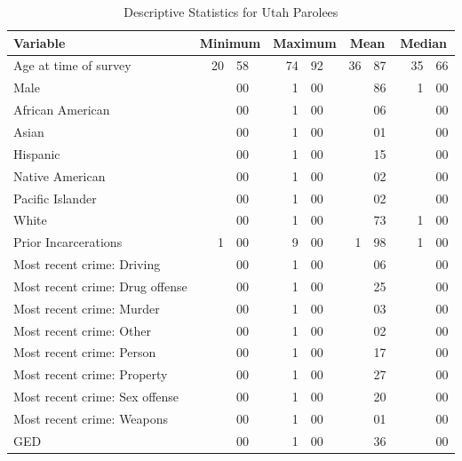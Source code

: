 \begin{table}[h]
\begin{center}
\caption{Descriptive Statistics for Utah Parolees}
\vspace{0.1cm}
\small
\begin{tabular}{lr@{.}lr@{.}lr@{.}lr@{.}l}
  \hline
  Variable & \multicolumn{2}{c}{Minimum} & \multicolumn{2}{c}{Maximum} & \multicolumn{2}{c}{Mean} & \multicolumn{2}{c}{Median} \\ \hline
  Age at time of survey & \hspace{0.25cm} 20 & 58 & \hspace{0.25cm} 74 & 92 & 36 & 87 & \ \ 35 & 66 \\
  Male                 &    & 00 &  1 & 00 &    & 86 &  1 & 00 \\
  African American     &    & 00 &  1 & 00 &    & 06 &    & 00 \\
  Asian                &    & 00 &  1 & 00 &    & 01 &    & 00 \\
  Hispanic             &    & 00 &  1 & 00 &    & 15 &    & 00 \\
  Native American      &    & 00 &  1 & 00 &    & 02 &    & 00 \\
  Pacific Islander     &    & 00 &  1 & 00 &    & 02 &    & 00 \\
  White                &    & 00 &  1 & 00 &    & 73 &  1 & 00 \\
  Prior Incarcerations &  1 & 00 &  9 & 00 &  1 & 98 &  1 & 00 \\
  Most recent crime: Driving      &    & 00 &  1 & 00 &    & 06 &    & 00 \\
  Most recent crime: Drug offense &    & 00 &  1 & 00 &    & 25 &    & 00 \\
  Most recent crime: Murder       &    & 00 &  1 & 00 &    & 03 &    & 00 \\
  Most recent crime: Other        &    & 00 &  1 & 00 &    & 02 &    & 00 \\
  Most recent crime: Person       &    & 00 &  1 & 00 &    & 17 &    & 00 \\
  Most recent crime: Property     &    & 00 &  1 & 00 &    & 27 &    & 00 \\
  Most recent crime: Sex offense  &    & 00 &  1 & 00 &    & 20 &    & 00 \\
  Most recent crime: Weapons      &    & 00 &  1 & 00 &    & 01 &    & 00 \\
  GED                                 &    & 00 &  1 & 00 &    & 36 &    & 00 \\

\end{tabular}
\end{center}
\end{table}
